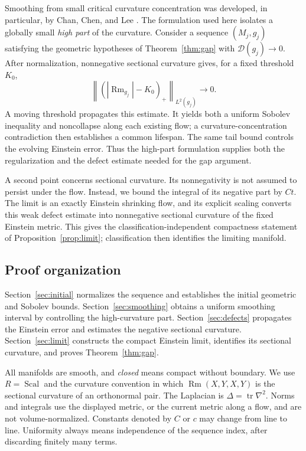 \documentclass[11pt]{article}
\theoremstyle{definition}
\theoremstyle{remark}
\numberwithin{equation}{section}
\DeclareMathOperator{\Rm}{Rm}
\DeclareMathOperator{\Scal}{Scal}
\newcommand{\norm}[1]{\left\lVert #1\right\rVert}
\begin{document}
Smoothing from small critical curvature concentration was developed,
in particular, by Chan, Chen, and Lee \cite{ChanChenLee}. The formulation
used here isolates a globally small \emph{high part} of the curvature.
Consider a sequence $(M_j,g_j)$ satisfying the geometric hypotheses of
Theorem~\ref{thm:gap} with $\mathcal D(g_j)\to0$. After normalization,
nonnegative sectional curvature gives, for a fixed threshold $K_0$,
\[
 \norm{(|\Rm_{g_j}|-K_0)_+}_{L^2(g_j)}\longrightarrow0.
\]
A moving threshold propagates this estimate. It yields both a uniform
Sobolev inequality and noncollapse along each existing flow; a
curvature-concentration contradiction then establishes a common
lifespan. The same tail bound controls the evolving Einstein error.
Thus the high-part formulation supplies both the regularization and
the defect estimate needed for the gap argument.

A second point concerns sectional curvature. Its nonnegativity is not
assumed to persist under the flow. Instead, we bound the integral of its
negative part by $Ct$. The limit is an exactly Einstein shrinking flow,
and its explicit scaling converts this weak defect estimate into
nonnegative sectional curvature of the fixed Einstein metric. This gives
the classification-independent compactness statement of
Proposition~\ref{prop:limit}; classification then identifies the limiting
manifold.

\subsection*{Proof organization}

Section~\ref{sec:initial} normalizes the sequence and establishes the
initial geometric and Sobolev bounds. Section~\ref{sec:smoothing} obtains
a uniform smoothing interval by controlling the high-curvature part.
Section~\ref{sec:defects} propagates the Einstein error and estimates the
negative sectional curvature. Section~\ref{sec:limit} constructs the
compact Einstein limit, identifies its sectional curvature, and proves
Theorem~\ref{thm:gap}.

All manifolds are smooth, and \emph{closed} means compact without
boundary. We use $R=\Scal$ and the curvature convention in which
$\Rm(X,Y,X,Y)$ is the sectional curvature of an orthonormal pair.
The Laplacian is $\Delta=\operatorname{tr}\nabla^2$. Norms and integrals
use the displayed metric, or the current metric along a flow, and are
not volume-normalized. Constants denoted by $C$ or $c$ may change from
line to line. Uniformity always means independence of the sequence
index, after discarding finitely many terms.
\end{document}
